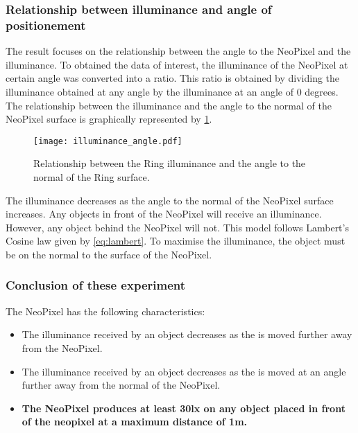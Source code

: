 \subsubsection{Relationship between illuminance and angle of positionement}
The result focuses on the relationship between the angle to the NeoPixel and the illuminance. To obtained the data of interest, the illuminance of the NeoPixel at certain angle was converted into a ratio. This ratio is obtained by dividing the illuminance obtained at any angle by the illuminance at an angle of 0 degrees. The relationship between the illuminance and the angle to the normal of the NeoPixel surface is graphically represented by \cref{fig:illuminance_angle}.
\begin{figure}[ht]
	\centering
	\texttt{[image: illuminance\_angle.pdf]}
	\caption{Relationship between the Ring illuminance and the angle to the normal of the Ring surface.}
	\label{fig:illuminance_angle}
\end{figure}
The illuminance decreases as the angle to the normal of the NeoPixel surface increases. Any objects in front of the NeoPixel will receive an illuminance. However, any object behind the NeoPixel will not. This model follows Lambert's Cosine law given by \cref{eq:lambert}. To maximise the illuminance, the object must be on the normal to the surface of the NeoPixel.

\subsubsection{Conclusion of these experiment}
The NeoPixel has the following characteristics:
\begin{itemize}
	\item The illuminance received by an object decreases as the is moved further away from the NeoPixel.
	\item The illuminance received by an object decreases as the is moved at an angle further away from the normal of the NeoPixel.
	\item \textbf{The NeoPixel produces at least 30lx on any object placed in front of the neopixel at a maximum distance of 1m.}
\end{itemize}